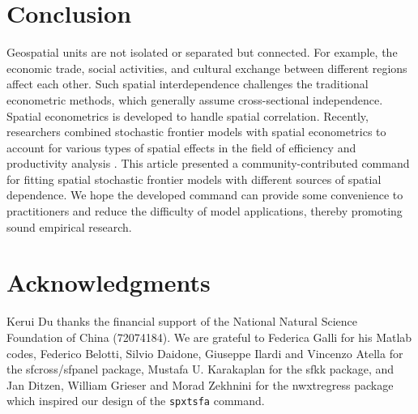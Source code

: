 
\section{Conclusion}\label{sec_conclusion}

Geospatial units are not isolated or separated but connected. For example, the economic trade, social activities, and cultural exchange between different regions affect each other. Such spatial interdependence challenges the traditional econometric methods, which generally assume cross-sectional independence. Spatial econometrics is developed to handle spatial correlation. Recently, researchers combined stochastic frontier models with spatial econometrics to account for various types of spatial effects in the field of efficiency and productivity analysis \citep{galli2022spatial,orea2019new}.  This article presented a community-contributed command for fitting spatial stochastic frontier models with different sources of spatial dependence. We hope the developed command can provide some convenience to practitioners and reduce the difficulty of model applications, thereby promoting sound empirical research. 




\section{Acknowledgments}
Kerui Du thanks the financial support of the National Natural Science Foundation of China (72074184).  We are grateful to Federica Galli for his Matlab codes, Federico Belotti, Silvio Daidone, Giuseppe Ilardi and Vincenzo Atella for the sfcross/sfpanel package, Mustafa U. Karakaplan for the sfkk package, and Jan Ditzen, William Grieser and Morad Zekhnini for the nwxtregress package which inspired our design of the {\tt spxtsfa} command. 



\endinput
